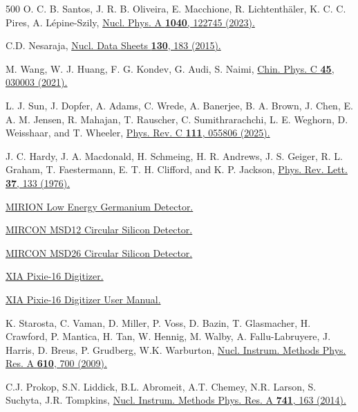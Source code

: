 \documentclass[aps,UTF8,prc,twocolumn,preprintnumbers,amsmath,amssymb,floatfix]{revtex4-2}
\begin{document}
\begin{thebibliography}{500}
O. C. B. Santos, J. R. B. Oliveira, E. Macchione, R. Lichtenth\"{a}ler, K. C. C. Pires, A. L\'{e}pine-Szily, \href{https://doi.org/10.1016/j.nuclphysa.2023.122745}{Nucl. Phys. A \textbf{1040}, 122745 (2023).}

C.D. Nesaraja, \href{https://doi.org/10.1016/j.nds.2015.11.004}{Nucl. Data Sheets \textbf{130}, 183 (2015).}

M. Wang, W. J. Huang, F. G. Kondev, G. Audi, S. Naimi, \href{https://doi.org/10.1088/1674-1137/abddaf}{Chin. Phys. C \textbf{45}, 030003 (2021).}

L. J. Sun, J. Dopfer, A. Adams, C. Wrede, A. Banerjee, B. A. Brown, J. Chen, E. A. M. Jensen, R. Mahajan, T. Rauscher, C. Sumithrarachchi, L. E. Weghorn, D. Weisshaar, and T. Wheeler, \href{https://doi.org/10.1103/PhysRevC.111.055806}{Phys. Rev. C \textbf{111}, 055806 (2025).}

J. C. Hardy, J. A. Macdonald, H. Schmeing, H. R. Andrews, J. S. Geiger, R. L. Graham, T. Faestermann, E. T. H. Clifford, and K. P. Jackson, \href{https://doi.org/10.1103/PhysRevLett.37.133}{Phys. Rev. Lett. \textbf{37}, 133 (1976).}

\href{https://www.mirion.com/products/lege-low-energy-germanium-detector}{MIRION Low Energy Germanium Detector.}

\href{http://www.micronsemiconductor.co.uk/product/msd012}{MIRCON MSD12 Circular Silicon Detector.}

\href{http://www.micronsemiconductor.co.uk/product/msd026}{MIRCON MSD26 Circular Silicon Detector.}

\href{https://xia.com/products/pixie-16/}{XIA Pixie-16 Digitizer.}

\href{https://docs.frib.msu.edu/daq/newsite/pixie16/Pixie16_UserManual.pdf}{XIA Pixie-16 Digitizer User Manual.}

K. Starosta, C. Vaman, D. Miller, P. Voss, D. Bazin, T. Glasmacher, H. Crawford, P. Mantica, H. Tan, W. Hennig, M. Walby, A. Fallu-Labruyere, J. Harris, D. Breus, P. Grudberg, W.K. Warburton, \href{https://doi.org/10.1016/j.nima.2009.09.016}{Nucl. Instrum. Methods Phys. Res. A \textbf{610}, 700 (2009).}

C.J. Prokop, S.N. Liddick, B.L. Abromeit, A.T. Chemey, N.R. Larson, S. Suchyta, J.R. Tompkins, \href{https://doi.org/10.1016/j.nima.2013.12.044}{Nucl. Instrum. Methods Phys. Res. A \textbf{741}, 163 (2014).}


\end{thebibliography}
\end{document}
